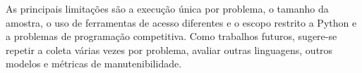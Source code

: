 \documentclass[12pt]{article}
\begin{document}
As principais limitações são a execução única por problema, o tamanho da amostra, o uso de
ferramentas de acesso diferentes e o escopo restrito a Python e a problemas de programação
competitiva. Como trabalhos futuros, sugere-se repetir a coleta várias vezes por problema,
avaliar outras linguagens, outros modelos e métricas de manutenibilidade.



\end{document}
